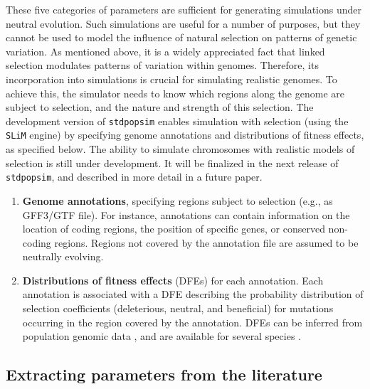 \documentclass[hidelinks]{article}
\newcommand{\stdpopsim}{\texttt{stdpopsim}\xspace}
\begin{document}
These five categories of parameters are sufficient for generating simulations
under neutral evolution. Such simulations are useful for a number of purposes,
but they cannot be used to model the influence of natural selection on patterns of genetic variation.
As mentioned above, it is a widely appreciated fact that linked selection modulates
patterns of variation within genomes.
Therefore, its incorporation into simulations is crucial for simulating realistic genomes.
To achieve this, the simulator needs to know which regions along the genome are subject to selection,
and the nature and strength of this selection.
The development version of \stdpopsim enables simulation with selection
(using the \texttt{SLiM} engine)
by specifying genome annotations and distributions of fitness effects,
as specified below.
The ability to simulate chromosomes with realistic models of
selection is still under development. It will be finalized in the next release of \stdpopsim,
and described in more detail in a future paper.

\begin{enumerate}
	\def\labelenumi{\arabic{enumi}.}
	\setcounter{enumi}{5}
	\item
	\textbf{Genome annotations}, specifying regions subject to selection (e.g., as GFF3/GTF file).
    For instance, annotations can contain information on the location of coding regions,
    the position of specific genes, or conserved non-coding regions.
    Regions not covered by the annotation file are assumed to be neutrally evolving.

	\item
	\textbf{Distributions of fitness effects} (DFEs) for each annotation.
    Each annotation is associated with a DFE describing
    the probability distribution of selection coefficients (deleterious, neutral, and beneficial)
    for mutations occurring in the region covered by the annotation.
    DFEs can be inferred from population genomic data \citep[reviewed in][]{Eyre-Walker2007},
    and are available for several species \citep[e.g.,][]{Ma2013, Huber2018}.
\end{enumerate}

\subsection*{Extracting parameters from the literature}
\end{document}
